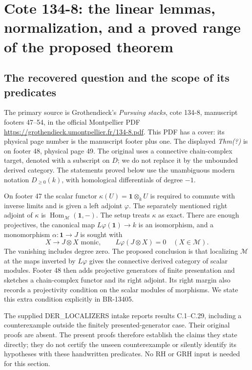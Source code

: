 \section{Cote 134-8: the linear lemmas, normalization, and a proved range of the proposed theorem}

\subsection{The recovered question and the scope of its predicates}
The primary source is Grothendieck's \emph{Pursuing stacks}, cote
134-8, manuscript footers 47--54, in the official Montpellier PDF
\url{https://grothendieck.umontpellier.fr/134-8.pdf}.  This PDF has a
cover: its physical page number is the manuscript footer plus one.
The displayed \emph{Thm(?)} is on footer 48, physical page 49.
The original uses a connective chain-complex target, denoted with a
subscript on \(D\); we do not replace it by the unbounded derived
category.  The statements proved below use the unambiguous modern
notation \(D_{\geq0}(k)\), with homological differentials of degree
\(-1\).

On footer 47 the scalar functor \(\kappa(U)=\mathbf1\otimes_k U\)
is required to commute with inverse limits and is given a left adjoint
\(\varphi\).  The separately mentioned right adjoint of \(\kappa\)
is \(\operatorname{Hom}_{\mathcal M}(\mathbf1,-)\).  The setup treats
\(\kappa\) as exact.  There are enough projectives, the canonical
map \(L\varphi(\mathbf1)\to k\) is an isomorphism, and a monomorphism
\(\alpha:\mathbf1\to J\) is sought with
\[
 X\longrightarrow J\otimes X\text{ monic},\qquad
 L\varphi(J\otimes X)=0\quad(X\in\mathcal M).
 \tag{134.1}
\]
The vanishing includes degree zero.  The proposed conclusion is that
localizing \(\mathcal M\) at the maps inverted by \(L\varphi\)
gives the connective derived category of scalar modules.  Footer 48
then adds projective generators of finite presentation and sketches a
chain-complex functor and its right adjoint.  Its right margin also
records a projectivity condition on the scalar modules of morphisms.
We state this extra condition explicitly in BR-13405.

The supplied DER\_LOCALIZERS intake reports results C.1--C.29,
including a counterexample outside the finitely presented-generator
case.  Their original proofs are absent.  The present proofs therefore
establish the claims they state directly; they do not certify the
unseen counterexample or silently identify its hypotheses with these
handwritten predicates.  No RH or GRH input is needed for this section.

